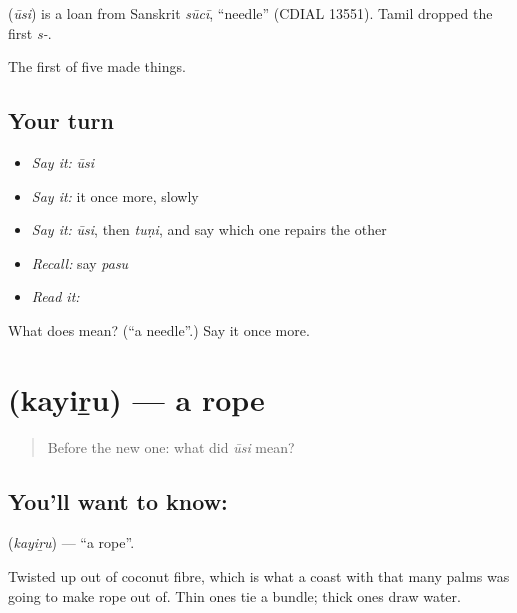 \begin{cousinweb}
\textbf{} (\emph{ūsi}) is a loan from Sanskrit \emph{sūcī}, \textquotedblleft{}needle\textquotedblright{} (CDIAL 13551). Tamil dropped the first \emph{s-}.
\end{cousinweb}

\begin{grammarlens}[title={What you've built}]
The first of five made things.
\end{grammarlens}

\subsection*{Your turn}
\begin{itemize}
\raggedright
  \item \emph{Say it:} \emph{ūsi}
  \item \emph{Say it:} it once more, slowly
  \item \emph{Say it:} \emph{ūsi}, then \emph{tuṇi}, and say which one repairs the other
  \item \emph{Recall:} say \emph{pasu}
  \item \emph{Read it:} \textbf{}
\end{itemize}

\begin{tcolorbox}[breakable,colback=teal!4,colframe=teal!35!black,title={Before you move on}]
What does  mean? (\textquotedblleft{}a needle\textquotedblright{}.) Say it once more.
\end{tcolorbox}
\section[\texorpdfstring{\ta{கயிறு} (kayiṟu)}{கயிறு (kayiṟu)}]{ (kayiṟu) — a rope}

\label{lesson:TA-C60-rope}



\begin{quote}
Before the new one: what did \emph{ūsi} mean?
\end{quote}

\subsection*{You'll want to know: }
\textbf{} (\emph{kayiṟu}) — \textquotedblleft{}a rope\textquotedblright{}.

Twisted up out of coconut fibre, which is what a coast with that many palms was going to make rope out of. Thin ones tie a bundle; thick ones draw water.

